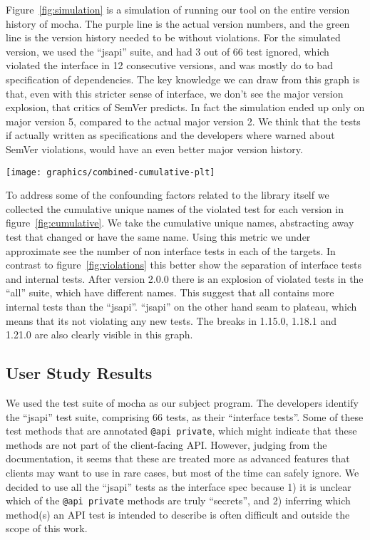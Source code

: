 Figure~\ref{fig:simulation} is a simulation of running our tool 
on the entire version history of mocha. The purple line is the 
actual version numbers, and the green line is the version history
needed to be without violations. For the simulated version, we used the
``jsapi'' suite, and had 3 out of 66 test ignored, which violated the interface
in 12 consecutive versions, and was mostly do to bad specification of
dependencies.  The key knowledge we can draw from this graph is that, even with
this stricter sense of interface, we don't see the major version explosion,
that critics of SemVer predicts. In fact the simulation ended up only on major
version 5, compared to the actual major version 2. We think that the tests if
actually written as specifications and the developers where warned about SemVer
violations, would have an even better major version history.

\begin{figure*}
\centering
\texttt{[image: graphics/combined-cumulative-plt]}
\caption{Cumulative names of violated tests} 
\label{fig:cumulative}
\end{figure*}

To address some of the confounding factors related to the library itself we
collected the cumulative unique names of the violated test for each version in
figure~\ref{fig:cumulative}. We take the cumulative unique names, abstracting
away test that changed or have the same name. Using this metric we under
approximate see the number of non interface tests in each of the targets. In
contrast to figure~\ref{fig:violations} this better show the separation of
interface tests and internal tests. After version 2.0.0 there is an explosion
of violated tests in the ``all'' suite, which have different names. This
suggest that all contains more internal tests than the ``jsapi''. ``jsapi'' on
the other hand seam to plateau, which means that its not violating any new
tests. The breaks in 1.15.0, 1.18.1 and 1.21.0 are also clearly visible in this
graph.


\subsection{User Study Results}
We used the test suite of mocha as our subject program. The developers
identify the ``jsapi'' test suite, comprising 66 tests, as their
``interface tests''. Some of these test methods that are annotated
{\tt @api private}, which might indicate that these methods are not
part of the client-facing API\@. However, judging from the
documentation, it seems that these are treated more as advanced
features that clients may want to use in rare cases, but most of the
time can safely ignore. We decided to use all the ``jsapi'' tests as the
interface spec because 1) it is unclear which of the {\tt @api
  private} methods are truly ``secrets'', and 2) inferring which
method(s) an API test is intended to describe is often difficult and
outside the scope of this work.

